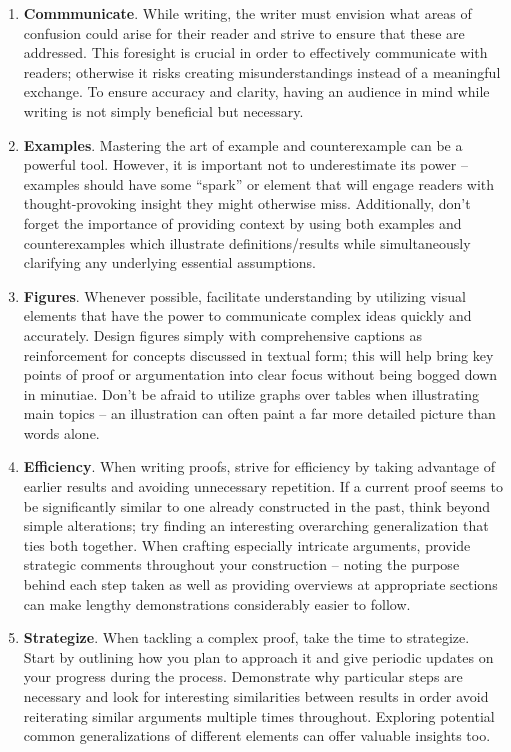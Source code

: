 \documentclass[
  twoside,
  12pt,
  letterpaper,
  fleqn]{article}
\begin{document}
\begin{enumerate}
\def\labelenumi{\arabic{enumi}.}
\item
  \textbf{Commmunicate}. While writing, the writer must envision what
  areas of confusion could arise for their reader and strive to ensure
  that these are addressed. This foresight is crucial in order to
  effectively communicate with readers; otherwise it risks creating
  misunderstandings instead of a meaningful exchange. To ensure accuracy
  and clarity, having an audience in mind while writing is not simply
  beneficial but necessary.
\item
  \textbf{Examples}. Mastering the art of example and counterexample can
  be a powerful tool. However, it is important not to underestimate its
  power -- examples should have some ``spark'' or element that will
  engage readers with thought-provoking insight they might otherwise
  miss. Additionally, don't forget the importance of providing context
  by using both examples and counterexamples which illustrate
  definitions/results while simultaneously clarifying any underlying
  essential assumptions.
\item
  \textbf{Figures}. Whenever possible, facilitate understanding by
  utilizing visual elements that have the power to communicate complex
  ideas quickly and accurately. Design figures simply with comprehensive
  captions as reinforcement for concepts discussed in textual form; this
  will help bring key points of proof or argumentation into clear focus
  without being bogged down in minutiae. Don't be afraid to utilize
  graphs over tables when illustrating main topics -- an illustration
  can often paint a far more detailed picture than words alone.
\item
  \textbf{Efficiency}. When writing proofs, strive for efficiency by
  taking advantage of earlier results and avoiding unnecessary
  repetition. If a current proof seems to be significantly similar to
  one already constructed in the past, think beyond simple alterations;
  try finding an interesting overarching generalization that ties both
  together. When crafting especially intricate arguments, provide
  strategic comments throughout your construction -- noting the purpose
  behind each step taken as well as providing overviews at appropriate
  sections can make lengthy demonstrations considerably easier to
  follow.
\item
  \textbf{Strategize}. When tackling a complex proof, take the time to
  strategize. Start by outlining how you plan to approach it and give
  periodic updates on your progress during the process. Demonstrate why
  particular steps are necessary and look for interesting similarities
  between results in order avoid reiterating similar arguments multiple
  times throughout. Exploring potential common generalizations of
  different elements can offer valuable insights too.
\end{enumerate}
\end{document}
